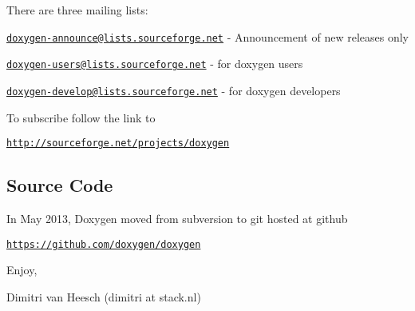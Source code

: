 There are three mailing lists\+:


\begin{DoxyItemize}
\item \href{mailto:doxygen-announce@lists.sourceforge.net}{\tt doxygen-\/announce@lists.\+sourceforge.\+net} -\/ Announcement of new releases only
\item \href{mailto:doxygen-users@lists.sourceforge.net}{\tt doxygen-\/users@lists.\+sourceforge.\+net} -\/ for doxygen users
\item \href{mailto:doxygen-develop@lists.sourceforge.net}{\tt doxygen-\/develop@lists.\+sourceforge.\+net} -\/ for doxygen developers
\item To subscribe follow the link to
\begin{DoxyItemize}
\item \href{http://sourceforge.net/projects/doxygen}{\tt http\+://sourceforge.\+net/projects/doxygen}
\end{DoxyItemize}
\end{DoxyItemize}

\subsection*{Source Code }

In May 2013, Doxygen moved from subversion to git hosted at github
\begin{DoxyItemize}
\item \href{https://github.com/doxygen/doxygen}{\tt https\+://github.\+com/doxygen/doxygen}
\end{DoxyItemize}

Enjoy,

Dimitri van Heesch (dimitri at stack.\+nl) 